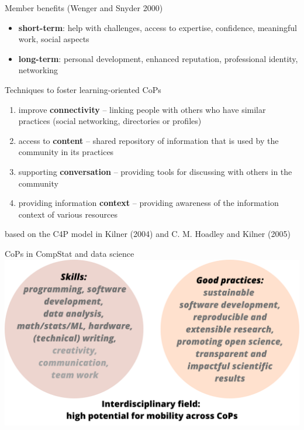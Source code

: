 \documentclass[
  ignorenonframetext,
]{beamer}
\begin{document}
\begin{frame}{Member benefits}
\protect\hypertarget{member-benefits}{}
(Wenger and Snyder 2000)

\begin{itemize}
\item
  \textbf{short-term}: help with challenges, access to expertise,
  confidence, meaningful work, social aspects \newline
\item
  \textbf{long-term}: personal development, enhanced reputation,
  professional identity, networking
\end{itemize}
\end{frame}

\begin{frame}{Techniques to foster learning-oriented CoPs}
\protect\hypertarget{techniques-to-foster-learning-oriented-cops}{}
\begin{enumerate}
\item
  improve \textbf{connectivity} -- linking people with others who have
  similar practices (social networking, directories or profiles)
\item
  access to \textbf{content} -- shared repository of information that is
  used by the community in its practices
\item
  supporting \textbf{conversation} -- providing tools for discussing
  with others in the community
\item
  providing information \textbf{context} -- providing awareness of the
  information context of various resources
\end{enumerate}

based on the C4P model in Kilner (2004) and C. M. Hoadley and Kilner
(2005)
\end{frame}

\begin{frame}{CoPs in CompStat and data science}
\protect\hypertarget{cops-in-compstat-and-data-science}{}
\includegraphics[width=1\textwidth,height=\textheight]{figs/4.png}
\end{frame}
\end{document}
